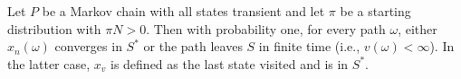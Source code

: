 Let $P$ be a Markov chain with all states transient and let $\pi$ be a starting distribution with $\pi N > 0$. Then with probability one, for every path $\omega$, either $x_n(\omega)$ converges in $S^*$ or the path leaves $S$ in finite time (i.e., $v(\omega) < \infty$). In the latter case, $x_v$ is defined as the last state visited and is in $S^*$.
